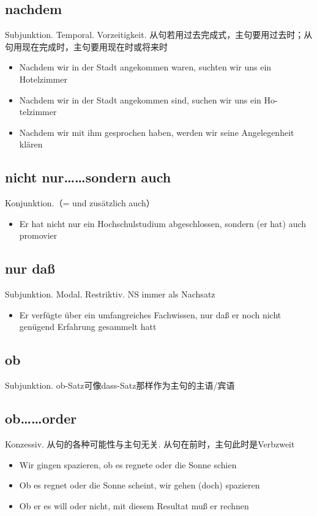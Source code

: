 \documentclass[UTF8]{report}
\begin{document}
\subsection{nachdem}
Subjunktion. Temporal. Vorzeitigkeit. 从句若用过去完成式，主句要用过去时；从句用现在完成时，主句要用现在时或将来时
\begin{itemize}
    \item Nachdem wir in der Stadt angekommen waren, suchten wir uns ein Hotelzimmer
    \item Nachdem wir in der Stadt angekommen sind, suchen wir uns ein Ho- telzimmer
    \item Nachdem wir mit ihm gesprochen haben, werden wir seine Angelegenheit klären
\end{itemize}

\subsection{nicht nur……sondern auch}
Konjunktion.（= und zusätzlich auch）
\begin{itemize}
    \item Er hat nicht nur ein Hochschulstudium abgeschlossen, sondern (er hat) auch promovier
\end{itemize}

\subsection{nur daß}
Subjunktion. Modal. Restriktiv. NS immer als Nachsatz
\begin{itemize}
    \item Er verfügte über ein umfangreiches Fachwissen, nur daß er noch nicht genügend Erfahrung gesammelt hatt
\end{itemize}

\subsection{ob}
Subjunktion. ob-Satz可像dass-Satz那样作为主句的主语/宾语

\subsection{ob……order}
Konzessiv. 从句的各种可能性与主句无关. 从句在前时，主句此时是Verbzweit
\begin{itemize}
    \item Wir gingen spazieren, ob es regnete oder die Sonne schien
    \item Ob es regnet oder die Sonne scheint, wir gehen (doch) spazieren
    \item Ob er es will oder nicht, mit diesem Resultat muß er rechnen
\end{itemize}
\end{document}
